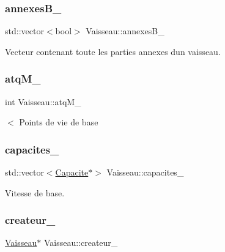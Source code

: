 \subsubsection{\texorpdfstring{annexes\+B\+\_\+}{annexesB\_}}
{\footnotesize\ttfamily std\+::vector$<$bool$>$ Vaisseau\+::annexes\+B\+\_\+\hspace{0.3cm}{\ttfamily [protected]}}



Vecteur contenant toute les parties annexes d\textquotesingle{}un vaisseau. 

\mbox{\label{class_vaisseau_a24d3d623d4f470aa1a11222c3872b2ec}} 
\subsubsection{\texorpdfstring{atq\+M\+\_\+}{atqM\_}}
{\footnotesize\ttfamily int Vaisseau\+::atq\+M\+\_\+\hspace{0.3cm}{\ttfamily [protected]}}



$<$ Points de vie de base 

\mbox{\label{class_vaisseau_a5db47e079dc15db1158bd0a549f22908}} 
\subsubsection{\texorpdfstring{capacites\+\_\+}{capacites\_}}
{\footnotesize\ttfamily std\+::vector$<$\hyperlink{class_capacite}{Capacite}$\ast$$>$ Vaisseau\+::capacites\+\_\+\hspace{0.3cm}{\ttfamily [protected]}}



Vitesse de base. 

\mbox{\label{class_vaisseau_a838e50295284e3b4996640054ab7ee30}} 
\subsubsection{\texorpdfstring{createur\+\_\+}{createur\_}}
{\footnotesize\ttfamily \hyperlink{class_vaisseau}{Vaisseau}$\ast$ Vaisseau\+::createur\+\_\+\hspace{0.3cm}{\ttfamily [protected]}}



